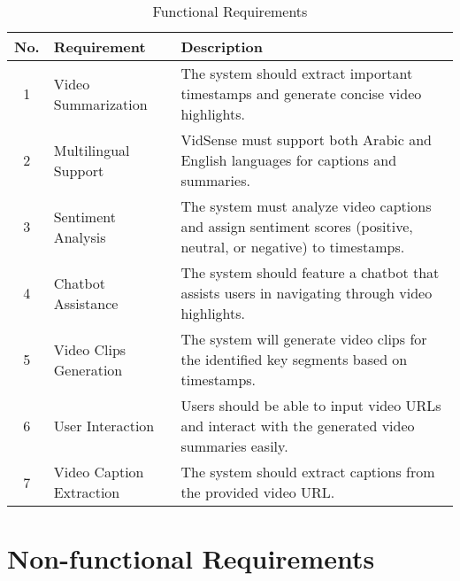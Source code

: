 \documentclass{bscs}
\begin{document}
\begin{table}[h]
    \centering
    \begin{tabular}{|c|p{5cm}|p{9cm}|}
        \hline
        \textbf{No.} & \textbf{Requirement} & \textbf{Description} \\
        \hline
        1 & Video Summarization & The system should extract important timestamps and generate concise video highlights. \\
        \hline
        2 & Multilingual Support & VidSense must support both Arabic and English languages for captions and summaries. \\
        \hline
        3 & Sentiment Analysis & The system must analyze video captions and assign sentiment scores (positive, neutral, or negative) to timestamps. \\
        \hline
        4 & Chatbot Assistance & The system should feature a chatbot that assists users in navigating through video highlights. \\
        \hline
        5 & Video Clips Generation & The system will generate video clips for the identified key segments based on timestamps. \\
        \hline
        6 & User Interaction & Users should be able to input video URLs and interact with the generated video summaries easily. \\
        \hline
        7 & Video Caption Extraction & The system should extract captions from the provided video URL. \\
        \hline
    \end{tabular}
    \caption{Functional Requirements}
\end{table}
\newpage

\section{Non-functional Requirements}
\end{document}

